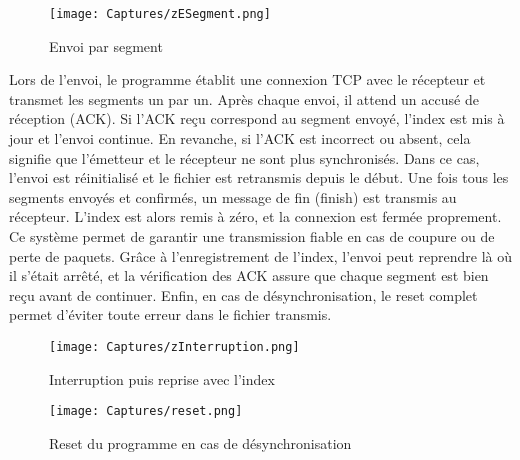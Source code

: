 \documentclass[a4paper,11pt]{article}
\begin{document}
\begin{figure}[H]
    \centering
    \texttt{[image: Captures/zESegment.png]}
    \caption{Envoi par segment}
    \label{fig:ad-hoc}
\end{figure}

\FloatBarrier

Lors de l’envoi, le programme établit une connexion TCP avec le récepteur et transmet les segments un par un. Après chaque envoi, il attend un accusé de réception (ACK). Si l’ACK reçu correspond au segment envoyé, l’index est mis à jour et l’envoi continue. En revanche, si l’ACK est incorrect ou absent, cela signifie que l’émetteur et le récepteur ne sont plus synchronisés. Dans ce cas, l’envoi est réinitialisé et le fichier est retransmis depuis le début.
Une fois tous les segments envoyés et confirmés, un message de fin (finish) est transmis au récepteur. L’index est alors remis à zéro, et la connexion est fermée proprement.
Ce système permet de garantir une transmission fiable en cas de coupure ou de perte de paquets. Grâce à l’enregistrement de l’index, l’envoi peut reprendre là où il s’était arrêté, et la vérification des ACK assure que chaque segment est bien reçu avant de continuer. Enfin, en cas de désynchronisation, le reset complet permet d’éviter toute erreur dans le fichier transmis.

\begin{figure}[H]
    \centering
    \texttt{[image: Captures/zInterruption.png]}
    \caption{Interruption puis reprise avec l'index}
    \label{fig:ad-hoc}
\end{figure}


\begin{figure}[H]
    \centering
    \texttt{[image: Captures/reset.png]}
    \caption{Reset du programme en cas de désynchronisation }
    \label{fig:ad-hoc}
\end{figure}


\quad
\end{document}
